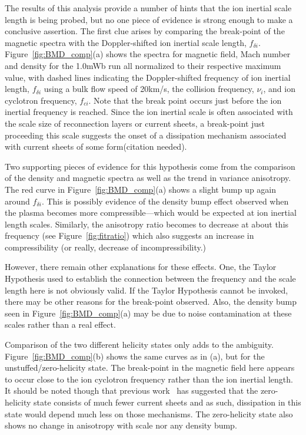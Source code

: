 \documentclass[aip,prl,amsmath,amssymb,reprint,superscriptaddress]{revtex4-1} %
\begin{document}
The results of this analysis provide a number of hints that the ion inertial scale length is being probed, but no one piece of evidence is strong enough to make a conclusive assertion. The first clue arises by comparing the break-point of the magnetic spectra with the Doppler-shifted ion inertial scale length, $f_{\delta i}$. Figure~\ref{fig:BMD_comp}(a) shows the spectra for magnetic field, Mach number and density for the 1.0mWb run all normalized to their respective maximum value, with dashed lines indicating the Doppler-shifted frequency of ion inertial length, $f_{\delta i}$ using a bulk flow speed of 20km/s, the collision frequency, $\nu_{i}$, and ion cyclotron frequency, $f_{ci}$. Note that the break point occurs just before the ion inertial frequency is reached. Since the ion inertial scale is often associated with the scale size of reconnection layers or current sheets, a break-point just proceeding this scale suggests the onset of a dissipation mechanism associated with current sheets of some form(citation needed).

Two supporting pieces of evidence for this hypothesis come from the comparison of the density and magnetic spectra as well as the trend in variance anisotropy. The red curve in Figure~\ref{fig:BMD_comp}(a) shows a slight bump up again around $f_{\delta i}$. This is possibly evidence of the density bump effect observed when the plasma becomes more compressible---which would be expected at ion inertial length scales. Similarly, the anisotropy ratio becomes to decrease at about this frequency (see Figure~\ref{fig:fitratio}) which also suggests an increase in compressibility (or really, decrease of incompressibility.)

However, there remain other explanations for these effects. One, the Taylor Hypothesis used to establish the connection between the frequency and the scale length here is not obviously valid. If the Taylor Hypothesis cannot be invoked, there may be other reasons for the break-point observed. Also, the density bump seen in Figure~\ref{fig:BMD_comp}(a) may be due to noise contamination at these scales rather than a real effect.

Comparison of the two different helicity states only adds to the ambiguity. Figure~\ref{fig:BMD_comp}(b) shows the same curves as in (a), but for the unstuffed/zero-helicity state. The break-point in the magnetic field here appears to occur close to the ion cyclotron frequency rather than the ion inertial length. It should be noted though that previous work~\cite{schaffner14b} has suggested that the zero-helicity state consists of much fewer current sheets and as such, dissipation in this state would depend much less on those mechanisms. The zero-helicity state also shows no change in anisotropy with scale nor any density bump.
\end{document}
